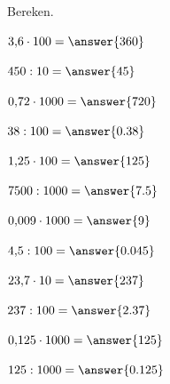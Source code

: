 \documentclass{ximera}
\begin{document}

\begin{oefening}{\oefB\ESS}

Bereken.

\begin{question} \(3{,}6\cdot100=\answer{360}\) \end{question}

\begin{question} \(450:10=\answer{45}\) \end{question}

\begin{question} \(0{,}72\cdot1000=\answer{720}\) \end{question}

\begin{question} \(38:100=\answer{0.38}\) \end{question}

\begin{question} \(1{,}25\cdot100=\answer{125}\) \end{question}

\begin{question} \(7500:1000=\answer{7.5}\) \end{question}

\begin{question} \(0{,}009\cdot1000=\answer{9}\) \end{question}

\begin{question} \(4{,}5:100=\answer{0.045}\) \end{question}

\begin{question} \(23{,}7\cdot10=\answer{237}\) \end{question}

\begin{question} \(237:100=\answer{2.37}\) \end{question}

\begin{question} \(0{,}125\cdot1000=\answer{125}\) \end{question}

\begin{question} \(125:1000=\answer{0.125}\) \end{question}

\end{oefening}
\end{document}
